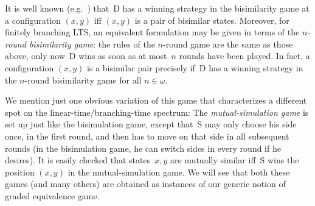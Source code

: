 \documentclass[sigconf,
			final%
			nonacm
                        ]{acmart}
\numberwithin{equation}{section}
\numberwithin{equation}{section}
\theoremstyle{plain}
\theoremstyle{definition}
\begin{document}
It is well known (e.g.~\cite{Stirling99}) that~D has a
winning strategy in the bisimilarity game at a configuration $(x, y)$
iff $(x, y)$ is a pair of bisimilar states. Moreover, for finitely
branching LTS, an equivalent formulation may be given in terms of the
\emph{$n$-round bisimilarity game}:
the rules of the $n$-round game are the same as those above, only
now~D wins as soon as at most~$n$ rounds have been played. In fact, a
configuration $(x, y)$ is a bisimilar pair precisely if~D has
a winning strategy in the $n$-round bisimilarity game for all
$n\in\omega$.

We mention just one obvious variation of this game that characterizes
a different spot on the linear-time/branching-time spectrum: The
\emph{mutual-simulation game} is set up just like the bisimulation
game, except that~S may only choose his side once, in the first round,
and then has to move on that side in all subsequent rounds (in the
bisimulation game, he can switch sides in every round if he
desires). It is easily checked that states~$x,y$ are mutually similar
iff~S wins the position $(x,y)$ in the mutual-simulation game. We will
see that both these games (and many others) are obtained
as instances of our generic notion of graded equivalence game.



\end{document}
